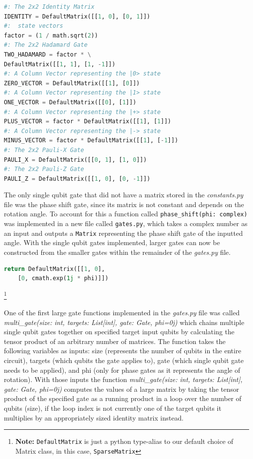 \documentclass{article}
\begin{document}
\begin{file}[constants.py]
\begin{lstlisting}[language=Python]
#: The 2x2 Identity Matrix
IDENTITY = DefaultMatrix([[1, 0], [0, 1]])
#:  state vectors
factor = (1 / math.sqrt(2))
#: The 2x2 Hadamard Gate
TWO_HADAMARD = factor * \
DefaultMatrix([[1, 1], [1, -1]])
#: A Column Vector representing the |0> state
ZERO_VECTOR = DefaultMatrix([[1], [0]])
#: A Column Vector representing the |1> state
ONE_VECTOR = DefaultMatrix([[0], [1]])
#: A Column Vector representing the |+> state
PLUS_VECTOR = factor * DefaultMatrix([[1], [1]])
#: A Column Vector representing the |-> state
MINUS_VECTOR = factor * DefaultMatrix([[1], [-1]])
#: The 2x2 Pauli-X Gate
PAULI_X = DefaultMatrix([[0, 1], [1, 0]])
#: The 2x2 Pauli-Z Gate
PAULI_Z = DefaultMatrix([[1, 0], [0, -1]])

\end{lstlisting}
\end{file}

The only single qubit gate that did not have a matrix stored in the \textit{constants.py} file was the phase shift gate, since its matrix is not constant and depends on the rotation angle.
To account for this a function called \verb#phase_shift(phi: complex)# was implemented in a new file called \verb#gates.py#, which takes a complex number as an input and outputs a \verb#Matrix# representing the phase shift gate of the inputted angle. 
With the single qubit gates implemented, larger gates can now be constructed from the smaller gates within the remainder of the \textit{gates.py} file.

\begin{file}
\begin{lstlisting}[language=Python]
return DefaultMatrix([[1, 0], 
	[0, cmath.exp(1j * phi)]])
\end{lstlisting}
\end{file}\footnote{\textbf{Note:} \verb#DefaultMatrix# is just a python type-alias to our default choice of Matrix class, in this case, \verb#SparseMatrix#}

One of the first large gate functions implemented in the \textit{gates.py} file was called \textit{multi\_gate(size: int, targets: List[int], gate: Gate, phi=0j)} which chains multiple single qubit gates together on specified target input qubits by calculating the tensor product of an arbitrary number of matrices. The function takes the following variables as inputs: size (represents the number of qubits in the entire circuit), targets (which qubits the gate applies to), gate (which single qubit gate needs to be applied), and phi (only for phase gates as it represents the angle of rotation). With those inputs the function \textit{multi\_gate(size: int, targets: List[int], gate: Gate, phi=0j)} computes the values of a large matrix by taking the tensor product of the specified gate as a running product in a loop over the number of qubits (size), if the loop index is not currently one of the target qubits it multiplies by an appropriately sized identity matrix instead.
\end{document}
